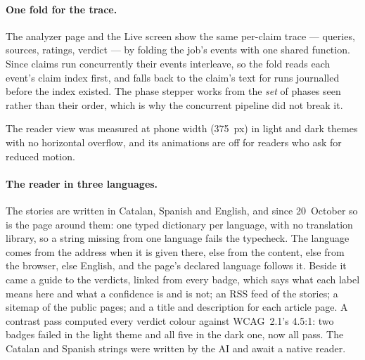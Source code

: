 \paragraph{One fold for the trace.} The analyzer page and the Live
screen show the same per-claim trace --- queries, sources, ratings,
verdict --- by folding the job's events with one shared function. Since
claims run concurrently their events interleave, so the fold reads each
event's claim index first, and falls back to the claim's text for runs
journalled before the index existed. The phase stepper works from the
\emph{set} of phases seen rather than their order, which is why the
concurrent pipeline did not break it.

The reader view was measured at phone width (375~px) in light and dark
themes with no horizontal overflow, and its animations are off for
readers who ask for reduced motion.

\paragraph{The reader in three languages.} The stories are written in
Catalan, Spanish and English, and since 20~October so is the page
around them: one typed dictionary per language, with no translation
library, so a string missing from one language fails the typecheck. The
language comes from the address when it is given there, else from the
content, else from the browser, else English, and the page's declared
language follows it. Beside it came a guide to the verdicts, linked
from every badge, which says what each label means here and what a
confidence is and is not; an RSS feed of the stories; a sitemap of the
public pages; and a title and description for each article page. A
contrast pass computed every verdict colour against WCAG~2.1's 4.5:1:
two badges failed in the light theme and all five in the dark one, now
all pass. The Catalan and Spanish strings were written by the AI and
await a native reader.
